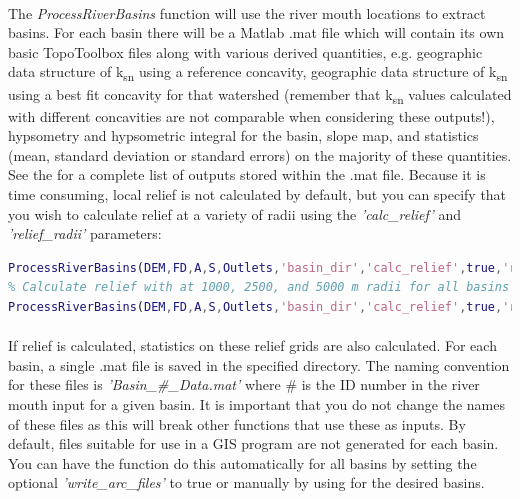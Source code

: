 \paragraph{}The \textit{ProcessRiverBasins} function will use the river mouth locations to extract basins. For each basin there will be a Matlab .mat file which will contain its own basic TopoToolbox files along with various derived quantities, e.g. geographic data structure of k\textsubscript{sn} using a reference concavity, geographic data structure of k\textsubscript{sn} using a best fit concavity for that watershed (remember that k\textsubscript{sn} values calculated with different concavities are not comparable when considering these outputs!), hypsometry and hypsometric integral for the basin, slope map, and statistics (mean, standard deviation or standard errors) on the majority of these quantities. See the  for a complete list of outputs stored within the .mat file. Because it is time consuming, local relief is not calculated by default, but you can specify that you wish to calculate relief at a variety of radii using the \textit{'calc\_relief'} and \textit{'relief\_radii'} parameters:

\begin{lstlisting}[language=Matlab]
% Calculate relief with a radius of 2500 m for all basins
ProcessRiverBasins(DEM,FD,A,S,Outlets,'basin_dir','calc_relief',true,'relief_radii',2500);
% Calculate relief with at 1000, 2500, and 5000 m radii for all basins
ProcessRiverBasins(DEM,FD,A,S,Outlets,'basin_dir','calc_relief',true,'relief_radii',[1000 2500 5000]);
\end{lstlisting}

\paragraph{}If relief is calculated, statistics on these relief grids are also calculated. For each basin, a single .mat file is saved in the specified directory. The naming convention for these files is \textit{'Basin\_\#\_Data.mat'} where \# is the ID number in the river mouth input for a given basin. It is important that you do not change the names of these files as this will break other functions that use these as inputs. By default, files suitable for use in a GIS program are not generated for each basin. You can have the function do this automatically for all basins by setting the optional \textit{'write\_arc\_files'} to true or manually by using  for the desired basins.


